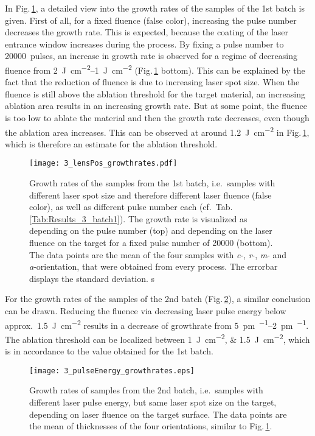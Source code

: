 
In Fig.\,\ref{Fig:Results_3_lensGrowthRate}, a detailed view into the growth rates of the samples of the 1st batch is given.
First of all, for a fixed fluence (false color), increasing the pulse number decreases the growth rate.
This is expected, because the coating of the laser entrance window increases during the process.
By fixing a pulse number to \qty{20000}{pulses}, an increase in growth rate is observed for a regime of decreasing fluence from \qtyrange{2}{1}{\joule\per\cm\squared} (Fig.\,\ref{Fig:Results_3_lensGrowthRate} bottom).
This can be explained by the fact that the reduction of fluence is due to increasing laser spot size.
When the fluence is still above the ablation threshold for the target material, an increasing ablation area results in an increasing growth rate.
But at some point, the fluence is too low to ablate the material and then the growth rate decreases, even though the ablation area increases.
This can be observed at around \qty{1.2}{\joule\per\cm\squared} in Fig.\,\ref{Fig:Results_3_lensGrowthRate}, which is therefore an estimate for the ablation threshold.
\begin{figure}
    \centering
    \texttt{[image: 3\_lensPos\_growthrates.pdf]}
    \caption{
    Growth rates of the samples from the 1st batch, i.e.\ samples with different laser spot size and therefore different laser fluence (false color), as well as different pulse number each (cf.\ Tab.\,\ref{Tab:Results_3_batch1}).
    The growth rate is visualized as depending on the pulse number (top) and depending on the laser fluence on the target for a fixed pulse number of \qty{20000}{} (bottom).
    The data points are the mean of the four samples with \textit{c}-, \textit{r}-, \textit{m}- and \textit{a}-orientation, that were obtained from every process.
    The errorbar displays the standard deviation.
s    }
    \label{Fig:Results_3_lensGrowthRate}
\end{figure}
%
For the growth rates of the samples of the 2nd batch (Fig.\,\ref{Fig:Results_3_pulseGrowthRate}), a similar conclusion can be drawn.
Reducing the fluence via decreasing laser pulse energy below approx.\ \qty{1.5}{\joule\per\cm\squared} results in a decrease of growthrate from \qtyrange{5}{2}{\pm\per\pulse}.
The ablation threshold can be localized between \qtylist{1;1.5}{\joule\per\cm\squared}, which is in accordance to the value obtained for the 1st batch.
\begin{figure}
    \centering
    \texttt{[image: 3\_pulseEnergy\_growthrates.eps]}
    \caption{Growth rates of samples from the 2nd batch, i.e.\ samples with different laser pulse energy, but same laser spot size on the target, depending on laser fluence on the target surface.
    The data points are the mean of thicknesses of the four orientations, similar to Fig.\,\ref{Fig:Results_3_lensGrowthRate}.}
    \label{Fig:Results_3_pulseGrowthRate}
\end{figure}
